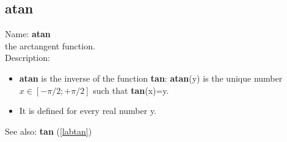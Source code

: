 \subsection{atan}
\label{labatan}
\noindent Name: \textbf{atan}\\
the arctangent function.\\
\noindent Description: \begin{itemize}

\item \textbf{atan} is the inverse of the function \textbf{tan}: \textbf{atan}(y) is the unique number 
   $x \in [-\pi/2; +\pi/2]$ such that \textbf{tan}(x)=y.

\item It is defined for every real number y.
\end{itemize}
See also: \textbf{tan} (\ref{labtan})
